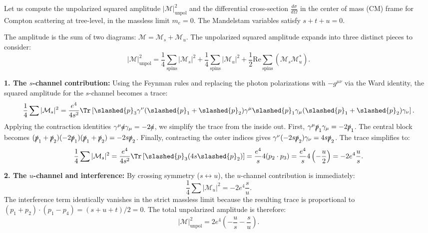 \begin{example}[Compton Scattering in QED with $m_e = 0$]
    Let us compute the unpolarized squared amplitude $\vert \mathcal{M} \vert^2_{\text{unpol}}$ and the differential cross-section $\frac{d\sigma}{d\Omega}$ in the center of mass (CM) frame for Compton scattering at tree-level, in the massless limit $m_e = 0$. The Mandelstam variables satisfy $s + t + u = 0$.

    The amplitude is the sum of two diagrams: $\mathcal{M} = \mathcal{M}_s + \mathcal{M}_u$. The unpolarized squared amplitude expands into three distinct pieces to consider:
    \[
        \vert \mathcal{M} \vert^2_{\text{unpol}} = \frac{1}{4} \sum_{\text{spins}} \vert \mathcal{M}_s \vert^2 + \frac{1}{4} \sum_{\text{spins}} \vert \mathcal{M}_u \vert^2 + \frac{1}{2} \text{Re} \sum_{\text{spins}} (\mathcal{M}_s \mathcal{M}_u^*).
    \]

    \textbf{1. The $s$-channel contribution:}
    Using the Feynman rules and replacing the photon polarizations with $-g^{\mu\nu}$ via the Ward identity, the squared amplitude for the $s$-channel becomes a trace:
    \[
        \frac{1}{4} \sum \vert \mathcal{M}_s \vert^2 = \frac{e^4}{4s^2} \Tr\left[ \slashed{p}_3 \gamma^\nu (\slashed{p}_1 + \slashed{p}_2) \gamma^\mu \slashed{p}_1 \gamma_\mu (\slashed{p}_1 + \slashed{p}_2) \gamma_\nu \right].
    \]
    Applying the contraction identities $\gamma^\mu \slashed{a} \gamma_\mu = -2\slashed{a}$, we simplify the trace from the inside out. First, $\gamma^\mu \slashed{p}_1 \gamma_\mu = -2\slashed{p}_1$. The central block becomes $(\slashed{p}_1 + \slashed{p}_2)(-2\slashed{p}_1)(\slashed{p}_1 + \slashed{p}_2) = -2s\slashed{p}_2$. Finally, contracting the outer indices gives $\gamma^\nu (-2s\slashed{p}_2) \gamma_\nu = 4s\slashed{p}_2$. The trace simplifies to:
    \[
        \frac{1}{4} \sum \vert \mathcal{M}_s \vert^2 = \frac{e^4}{4s^2} \Tr\left[ \slashed{p}_3 (4s\slashed{p}_2) \right] = \frac{e^4}{s} 4(p_2 \cdot p_3) = \frac{e^4}{s} 4\left(-\frac{u}{2}\right) = - 2e^4 \frac{u}{s}.
    \]

    \textbf{2. The $u$-channel and interference:}
    By crossing symmetry ($s \leftrightarrow u$), the $u$-channel contribution is immediately:
    \[
        \frac{1}{4} \sum \vert \mathcal{M}_u \vert^2 = - 2e^4 \frac{s}{u}.
    \]
    The interference term identically vanishes in the strict massless limit because the resulting trace is proportional to $(p_1+p_2)\cdot(p_1-p_4) = (s+u+t)/2 = 0$. The total unpolarized amplitude is therefore:
    \[
        \vert \mathcal{M} \vert^2_{\text{unpol}} = 2e^4 \left( -\frac{u}{s} - \frac{s}{u} \right).
    \]


\end{example}
